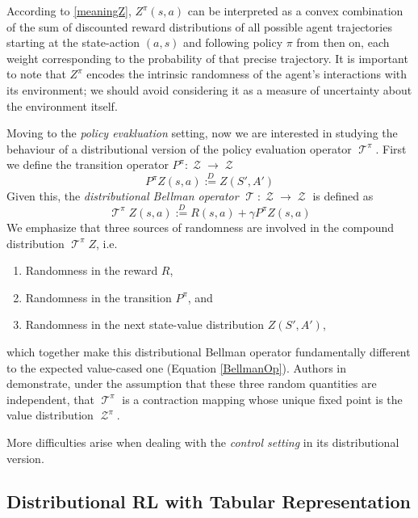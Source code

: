 \documentclass[12pt,a4paper,openright,twoside]{article}
\DeclareMathOperator*{\T}{\mathcal{T}}
\DeclareMathOperator*{\Z}{\mathcal{Z}}
\numberwithin{equation}{section}
\theoremstyle{definition}
\theoremstyle{remark}
\theoremstyle{plain}
\begin{document}
According to \ref{meaningZ}, $Z^{\pi}(s,a)$ can be interpreted as a convex combination of the sum of discounted reward distributions of all possible agent trajectories starting at the state-action $(a,s)$ and following policy $\pi$ from then on, each weight corresponding to the probability of that precise trajectory. It is important to note that $Z^\pi$ encodes the intrinsic randomness of the agent's interactions with its environment; we should avoid considering it as a measure of uncertainty about the environment itself.

Moving to the \textit{policy evakluation} setting, now we are interested in studying the behaviour of a distributional version of the policy evaluation operator $\T^\pi$. First we define the transition operator $P^\pi : \Z \rightarrow \Z$ 
\begin{equation} \label{distTransitionOp}
	P^\pi Z(s,a) \stackrel{D}{:=} Z(S',A')
\end{equation}
Given this, the \textit{distributional Bellman operator} $\T : \Z \rightarrow \Z$ is defined as
\begin{equation} \label{distBellmanOp}
	{\T}^\pi Z(s,a) \stackrel{D}{:=} R(s,a) + \gamma P^{\pi} Z(s,a)
\end{equation}
We emphasize that three sources of randomness are involved in the compound distribution ${\T}^\pi Z$, i.e.
\begin{enumerate}
	\item Randomness in the reward $R$,
	\item Randomness in the transition $P^\pi$, and
	\item Randomness in the next state-value distribution $Z(S', A')$,
\end{enumerate} 
which together make this distributional Bellman operator fundamentally different to the expected value-cased one (Equation \ref{BellmanOp}). Authors in \cite{DRL} demonstrate, under the assumption that these three random quantities are independent, that ${\T}^\pi$ is a contraction mapping whose unique fixed point is the value distribution $\Z^\pi$.


More difficulties arise when dealing with the \textit{control setting} in its distributional version.



\subsection{Distributional RL with Tabular Representation}
\end{document}
